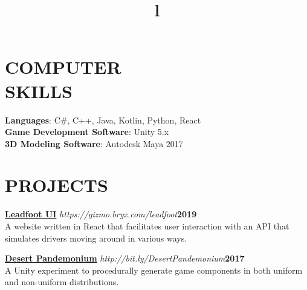 \documentclass[line,margin]{res}
\begin{document}
\begin{resume}
\section{COMPUTER\\SKILLS}
\textbf{Languages}: C\#, C++, Java, Kotlin, Python, React\\
\textbf{Game Development Software}: Unity 5.x\\
\textbf{3D Modeling Software}: Autodesk Maya 2017
\section{PROJECTS}
\par
    \href{https://gizmo.bryx.com/leadfoot}{\textbf{Leadfoot UI}}
    {\sl https://gizmo.bryx.com/leadfoot}\hfill \textbf{2019}\\ 
    A website written in React that facilitates user interaction with an API that simulates drivers moving around in various ways.
	
	\par
    \href{https://github.com/MaeveMonster/DesertPandemonium}{\textbf{Desert Pandemonium}}
    {\sl http://bit.ly/DesertPandemonium}\hfill \textbf{2017}\\ 
    A Unity experiment to procedurally generate game components in both uniform and non-uniform distributions.


\begin{format}
\title{l}\\
\\
\body\\
\end{format}

\end{resume}
\end{document}
